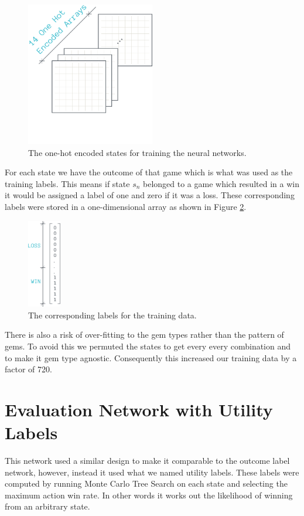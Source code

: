\documentclass{bhamthesis}
\theoremstyle{definition}
\begin{document}
 \begin{figure}
 	\centering
 	\includegraphics[width=0.5\textwidth]{media/img/nnTraining}
 	\caption{The one-hot encoded states for training the neural networks.}\label{f:nnTraining}
 \end{figure}
 
For each state we have the outcome of that game which is what was used as the training labels. This means if state $s_n$ belonged to a game which resulted in a win it would be assigned a label of one and zero if it was a loss. These corresponding labels were stored in a one-dimensional array as shown in Figure \ref{f:nnLabels}.

 \begin{figure}
	\centering
	\includegraphics[width=0.13\textwidth]{media/img/nnLabels}
	\caption{The corresponding labels for the training data.}\label{f:nnLabels}
\end{figure}

There is also a risk of over-fitting to the gem types rather than the pattern of gems. To avoid this we permuted the states to get every every combination and to make it gem type agnostic. Consequently this increased our training data by a factor of 720.

\section{Evaluation Network with Utility Labels}
This network used a similar design to make it comparable to the outcome label network, however, instead it used what we named utility labels. These labels were computed by running Monte Carlo Tree Search on each state and selecting the maximum action win rate. In other words it works out the likelihood of winning from an arbitrary state.
\end{document}
